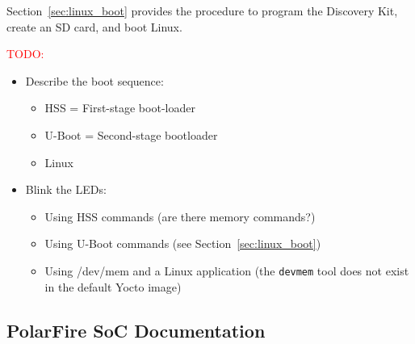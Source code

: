 Section~\ref{sec:linux_boot} provides the procedure to program the Discovery Kit,
create an SD card, and boot Linux.

\vskip5mm
\noindent\textcolor{red}{TODO:}
\begin{itemize}
\item Describe the boot sequence:
\begin{itemize}
\item HSS = First-stage boot-loader
\item U-Boot = Second-stage bootloader
\item Linux
\end{itemize}
\item Blink the LEDs:
\begin{itemize}
\item Using HSS commands (are there memory commands?)
\item Using U-Boot commands (see Section~\ref{sec:linux_boot})
\item Using /dev/mem and a Linux application\newline
(the \verb+devmem+ tool does not exist in the default Yocto image)
\end{itemize}
\end{itemize}

\subsection{PolarFire SoC Documentation}

